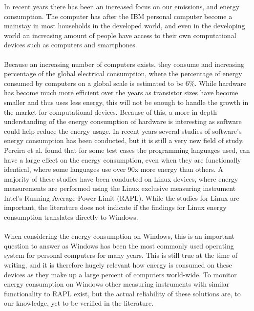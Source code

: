 In recent years there has been an increased focus on our emissions, and energy consumption. 
The computer has after the IBM personal computer become a mainstay in most households in the developed world, and even in the developing world an increasing amount of people have access to their own computational devices such as computers and smartphones\cite{DevelopedWorldPC}. 

\paragraph*{}
Because an increasing number of computers exists, they consume and increasing percentage of the global electrical consumption, where the percentage of energy consumed by computers on a global scale is estimated to be 6\%\cite{somavat2011energy}. While hardware has become much more efficient over the years as transistor sizes have become smaller and thus uses less energy, this will not be enough to handle the growth in the market for computational devices\cite{procaccianti2011profiling}. Because of this, a more in depth understanding of the energy consumption of hardware is interesting as software could help reduce the energy usage\cite{somavat2011energy}. In recent years several studies of software's energy consumption has been conducted, but it is still a very new field of study. Pereira et al.\cite{Pereira2017} found that for some test cases the programming languages used, can have a large effect on the energy consumption, even when they are functionally identical, where some languages use over 90x more energy than others. A majority of these studies have been conducted on Linux devices, where energy measurements are performed using the Linux exclusive measuring instrument Intel's Running Average Power Limit (RAPL). While the studies for Linux are important, the literature does not indicate if the findings for Linux energy consumption translates directly to Windows\cite{Pereira2017}. 

\paragraph*{}
When considering the energy consumption on Windows, this is an important question to answer as Windows has been the most commonly used operating system for personal computers for many years. This is still true at the time of writing, and it is therefore hugely relevant how energy is consumed on these devices as they make up a large percent of computers world-wide\cite{OSShare}. To monitor energy consumption on Windows other measuring instruments with similar functionality to RAPL exist, but the actual reliability of these solutions are, to our knowledge, yet to be verified in the literature.

